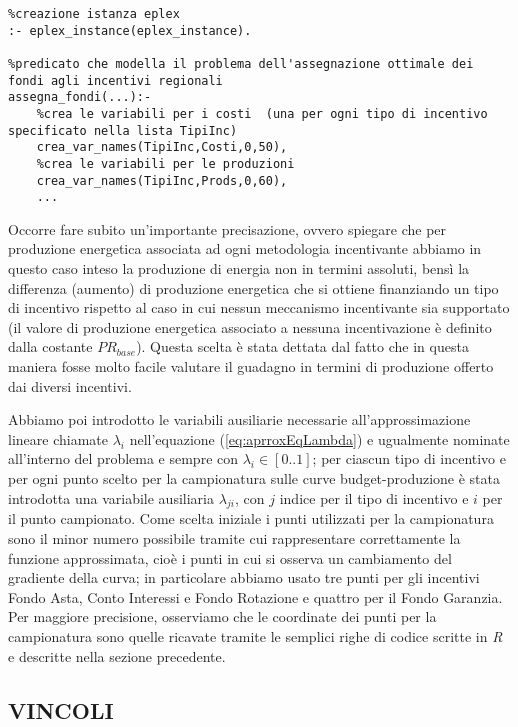 \documentclass[12pt,a4paper,openright,twoside]{report}
\begin{document}
\lstset{language=Prolog}
\begin{lstlisting}
%creazione istanza eplex
:- eplex_instance(eplex_instance).

%predicato che modella il problema dell'assegnazione ottimale dei fondi agli incentivi regionali
assegna_fondi(...):-
	%crea le variabili per i costi  (una per ogni tipo di incentivo specificato nella lista TipiInc)
	crea_var_names(TipiInc,Costi,0,50),
	%crea le variabili per le produzioni
	crea_var_names(TipiInc,Prods,0,60),
	...
\end{lstlisting}

Occorre fare subito un'importante precisazione, ovvero spiegare che per produzione energetica associata ad ogni metodologia incentivante abbiamo in questo caso inteso la produzione di energia non in termini assoluti, bensì la differenza (aumento) di produzione energetica che si ottiene finanziando un tipo di incentivo rispetto al caso in cui nessun meccanismo incentivante sia supportato (il valore di produzione energetica associato a nessuna incentivazione è definito dalla costante $PR_{base}$). Questa scelta è stata dettata dal fatto che in questa maniera fosse molto facile valutare il guadagno in termini di produzione offerto dai diversi incentivi.

Abbiamo poi introdotto le variabili ausiliarie necessarie all'approssimazione lineare chiamate $\lambda_i$ nell'equazione (\ref{eq:aprroxEqLambda}) e ugualmente nominate all'interno del problema e sempre con $\lambda_i \in [0..1]$; per ciascun tipo di incentivo e per ogni punto scelto per la campionatura sulle curve budget-produzione è stata introdotta una variabile ausiliaria $\lambda_{ji}$, con $j$ indice per il tipo di incentivo e $i$ per il punto campionato. Come scelta iniziale i punti utilizzati per la campionatura sono il minor numero possibile tramite cui rappresentare correttamente la funzione approssimata, cioè i punti in cui si osserva un cambiamento del gradiente della curva; in particolare abbiamo usato tre punti per gli incentivi Fondo Asta, Conto Interessi e Fondo Rotazione e quattro per il Fondo Garanzia. Per maggiore precisione, osserviamo che le coordinate dei punti per la campionatura sono quelle ricavate tramite le semplici righe di codice scritte in \emph{R} e descritte nella sezione precedente. 

\subsection{VINCOLI}
\end{document}
